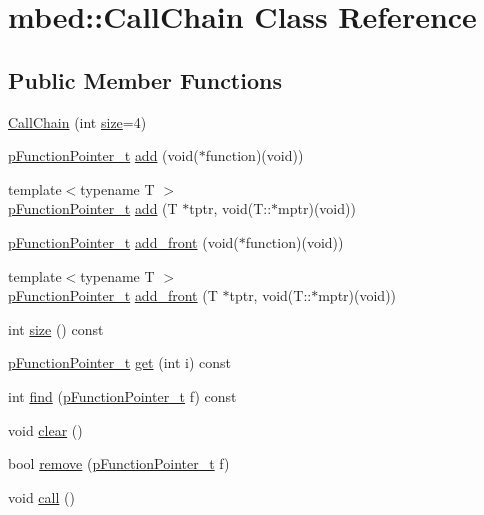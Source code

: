 \hypertarget{classmbed_1_1CallChain}{}\section{mbed\+:\+:Call\+Chain Class Reference}
\label{classmbed_1_1CallChain}
\subsection*{Public Member Functions}
\begin{DoxyCompactItemize}
\item 
\hyperlink{classmbed_1_1CallChain_a01b2b14e23b60c4d81522b19ef04cd9b}{Call\+Chain} (int \hyperlink{classmbed_1_1CallChain_ac2231dfa186291dbe64f7756be5f78fb}{size}=4)
\item 
\hyperlink{classmbed_1_1FunctionPointerArg1}{p\+Function\+Pointer\+\_\+t} \hyperlink{classmbed_1_1CallChain_a232d59392bfaff0d3950a240f2fee952}{add} (void($\ast$function)(void))
\item 
{\footnotesize template$<$typename T $>$ }\\\hyperlink{classmbed_1_1FunctionPointerArg1}{p\+Function\+Pointer\+\_\+t} \hyperlink{classmbed_1_1CallChain_a9bd78a3e92768bfafb562d0257297247}{add} (T $\ast$tptr, void(T\+::$\ast$mptr)(void))
\item 
\hyperlink{classmbed_1_1FunctionPointerArg1}{p\+Function\+Pointer\+\_\+t} \hyperlink{classmbed_1_1CallChain_a050f0042e62f8271a507ca57d19e6846}{add\+\_\+front} (void($\ast$function)(void))
\item 
{\footnotesize template$<$typename T $>$ }\\\hyperlink{classmbed_1_1FunctionPointerArg1}{p\+Function\+Pointer\+\_\+t} \hyperlink{classmbed_1_1CallChain_ae7f7fe79166ad44e24131a4609a61a14}{add\+\_\+front} (T $\ast$tptr, void(T\+::$\ast$mptr)(void))
\item 
int \hyperlink{classmbed_1_1CallChain_ac2231dfa186291dbe64f7756be5f78fb}{size} () const 
\item 
\hyperlink{classmbed_1_1FunctionPointerArg1}{p\+Function\+Pointer\+\_\+t} \hyperlink{classmbed_1_1CallChain_aed5a10fb63c039c7163472bff18a18a0}{get} (int i) const 
\item 
int \hyperlink{classmbed_1_1CallChain_a124e1ee11cac95565e2b3e69453ac9e1}{find} (\hyperlink{classmbed_1_1FunctionPointerArg1}{p\+Function\+Pointer\+\_\+t} f) const 
\item 
void \hyperlink{classmbed_1_1CallChain_a65693758d2e75e3390e64d27b98556c2}{clear} ()
\item 
bool \hyperlink{classmbed_1_1CallChain_a4396b8d6374b95f13c95775bd8e0137a}{remove} (\hyperlink{classmbed_1_1FunctionPointerArg1}{p\+Function\+Pointer\+\_\+t} f)
\item 
void \hyperlink{classmbed_1_1CallChain_ac911bd44ea0a14da0b0dd46187bf1081}{call} ()
\end{DoxyCompactItemize}


